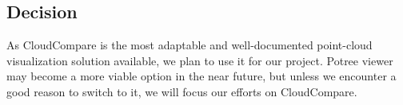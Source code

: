 \documentclass{article}
\begin{document}
\subsection{Decision}
As CloudCompare is the most adaptable and well-documented point-cloud visualization solution available, we plan to use it for our project. 
Potree viewer may become a more viable option in the near future, but unless we encounter a good reason to switch to it, we will focus our efforts on CloudCompare. 

\newpage


\end{document}
